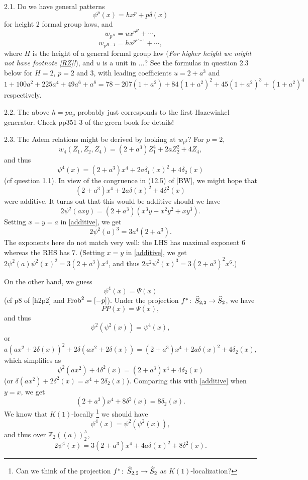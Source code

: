 \documentclass{rs}
\theoremstyle{definition}
\theoremstyle{remark}
\def\co{\colon\thinspace}
\renewcommand{\=}{\approx}
\renewcommand{\-}{\sim}
\numberwithin{equation}{section}
\numberwithin{thm}{section}
\begin{document}
2.1. Do we have general patterns
\[
 \psi^p(x) = h x^p + p \delta(x)
\]
for height 2 formal group laws, and
\[
 w_{p^H} = u x^{p^H} + \cdots,
\]
\[
 w_{p^{H-1}} = h x^{p^{H-1}} + \cdots,
\]
where $H$ is the height of a general formal group law ({\em For higher height we might not have footnote \ref{RZ}!}), and $u$ is a unit in ...? 
See the formulas in question 2.3 below for $H = 2$, $p = 2$ and 3, with leading coefficients $u = 2 + a^3$ and 
$1 + 100 a^2 + 225 a^4 + 49 a^6 + a^8 = 78 - 207 (1 + a^2) + 84 (1 + a^2)^2 + 45 (1 + a^2)^3 + (1 + a^2)^4$ respectively.

2.2. The above $h = p a_p$ probably just corresponds to the first Hazewinkel generator. Check pp351-3 of the green book for details!

2.3. The Adem relations might be derived by looking at $w_{p^2}$? For $p = 2$,
\[
 w_4 (Z_1,Z_2,Z_4) = (2 + a^3) Z_1^4 + 2 a Z_2^2 + 4 Z_4,
\]
and thus
\begin{equation}
\label{D_2}
 \psi^4(x) = (2 + a^3) x^4 + 2 a \delta_1(x)^2 + 4 \delta_2(x)
\end{equation}
(cf question 1.1). In view of the congruence in (12.5) of [BW], we might hope that 
\[
 (2 + a^3) x^4 + 2 a \delta(x)^2 + 4 \delta^2(x)
\]
were additive. It turns out that this would be additive should we have 
\begin{equation}
\label{additive}
 2 \psi^2(a x y) = (2 + a^3) (x^3 y + x^2 y^2 + x y^3).
\end{equation}
Setting $x = y = a$ in \eqref{additive}, we get 
\begin{equation}
\label{D_2a}
 2 \psi^2(a)^3 = 3 a^4 (2 + a^3).
\end{equation}
The exponents here do not match very well: the LHS has maximal exponent 6 whereas the RHS has 7. 
(Setting $x = y$ in \eqref{additive}, we get $2 \psi^2(a) \psi^2(x)^2 = 3 (2 + a^3) x^4$, and thus $2 a^2 \psi^2(x)^3 = 3 (2 + a^3)^2 x^6$.)

On the other hand, we guess
\[
 \psi^4(x) = \Psi(x)
\]
(cf p8 of [h2p2] and ${\rm Frob}^2 = [-p]$). Under the projection $f^* \co \widehat{S}_{2,2} \to \widehat{S}_2$, we have
\[
 PP(x) = \Psi(x),
\]
and thus
\[
 \psi^2(\psi^2(x)) = \psi^4(x),
\]
or
\[
 a (a x^2 + 2 \delta(x))^2 + 2 \delta(a x^2 + 2 \delta(x)) = (2 + a^3) x^4 + 2 a \delta(x)^2 + 4 \delta_2(x),
\]
which simplifies as 
\begin{equation}
\label{cong0}
 \psi^2(a x^2) + 4 \delta^2(x) = (2 + a^3) x^4 + 4 \delta_2(x)
\end{equation}
(or $\delta(a x^2) + 2 \delta^2(x) = x^4 + 2 \delta_2(x)$). 
Comparing this with \eqref{additive} when $y = x$, we get
\[
 (2 + a^3) x^4 + 8 \delta^2(x) = 8 \delta_2(x).
\]
We know that $K(1)$-locally \footnote{Can we think of the projection $f^* \co \widehat{S}_{2,2} \to \widehat{S}_2$ as $K(1)$-localization?} we should have
\[
 \psi^4(x) = \psi^2(\psi^2(x)),
\]
and thus over $\mathbb{Z}_2(\!(a)\!)^\wedge_2$,
\[
 2 \psi^4(x) = 3 (2 + a^3) x^4 + 4 a \delta(x)^2 + 8 \delta^2(x).
\]
\end{document}
